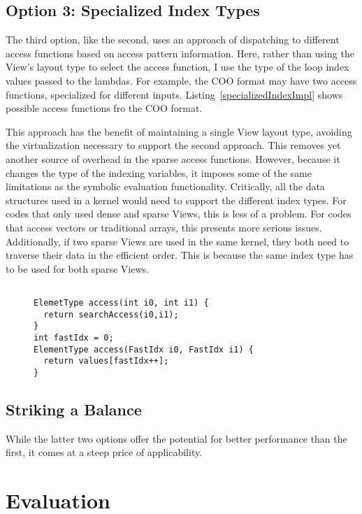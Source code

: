 \subsection{Option 3: Specialized Index Types}
The third option, like the second, uses an approach of dispatching to different access functions based on access pattern information.
Here, rather than using the View's layout type to select the access function, I use the type of the loop index values passed to the lambdas.
For example, the COO format may have two access functions, specialized for different inputs.
Listing~\ref{specializedIndexImpl} shows possible access functions fro the COO format.

This approach has the benefit of maintaining a single View layout type, avoiding the virtualization necessary to support the second approach.
This removes yet another source of overhead in the sparse access functions.
However, because it changes the type of the indexing variables, it imposes some of the same limitations as the symbolic evaluation functionality. 
Critically, all the data structures used in a kernel would need to support the different index types. 
For codes that only used dense and sparse Views, this is less of a problem.
For codes that access vectors or traditional arrays, this presents more serious issues.
Additionally, if two sparse Views are used in the same kernel, they both need to traverse their data in the efficient order.
This is because the same index type has to be used for both sparse Views.


\begin{figure}
\begin{lstlisting}[caption={Reference implementation for the Specialized Index Types approach.}, label=specializedIndexImp]

ElemetType access(int i0, int i1) {
  return searchAccess(i0,i1);
}
int fastIdx = 0;
ElementType access(FastIdx i0, FastIdx i1) {
  return values[fastIdx++];
}
\end{lstlisting}
\end{figure}

\subsection{Striking a Balance}
While the latter two options offer the potential for better performance than the first, it comes at a steep price of applicability.


\section{Evaluation}

